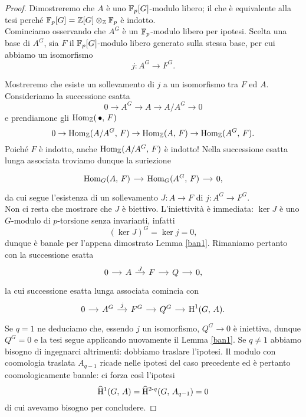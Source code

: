 \begin{proof}
	Dimostreremo che $ A $ è uno $ \mathbb{F}_p[G] $-modulo libero; il che è equivalente alla tesi perché $ \mathbb{F}_p[G] = \mathbb{Z}[G] \otimes_{\mathbb{Z}} \mathbb{F}_p $ è indotto. \\
	
	Cominciamo osservando che $ A^G $ è un $ \mathbb{F}_p $-modulo libero per ipotesi. Scelta una base di $ A^G $, sia $ F $ il $ \mathbb{F}_p[G] $-modulo libero generato sulla stessa base, per cui abbiamo un isomorfismo
	\[ j \colon A^G \to F^G. \]
	
	Mostreremo che esiste un sollevamento di $ j $ a un isomorfismo tra $ F $ ed $ A $. Consideriamo la successione esatta
	\[ 0 \to A^G \to A \to A/A^G \to 0 \]
	e prendiamone gli $ \operatorname{Hom}_{\mathbb{Z}}(\, \bullet, \, F) $
	\begin{equation}\label{homsucc1}
		0 \to \operatorname{Hom}_{\mathbb{Z}}(A/A^G, \, F) \to \operatorname{Hom}_{\mathbb{Z}}(A, \, F) \to \operatorname{Hom}_{\mathbb{Z}}(A^G, \, F).
	\end{equation}
	Poiché $ F $ è indotto, anche $ \operatorname{Hom}_{\mathbb{Z}}(A/A^G, \, F) $ è indotto! Nella successione esatta lunga associata troviamo dunque la suriezione
	\[ \begin{tikzcd}[column sep = small]
	\Hom_G(A, \, F) \rar & \Hom_G(A^G, \, F) \rar & 0,
	\end{tikzcd}\]
	da cui segue l'esistenza di un sollevamento $ J \colon A \to F $ di $ j \colon A^G \to F^G. $ \\
	
	Non ci resta che mostrare che $ J $ è biettivo. L'iniettività è immediata: $ \ker J $ è uno $ G $-modulo di $ p $-torsione senza invarianti, infatti
	\[ (\ker J)^G = \ker j = 0, \]
	dunque è banale per l'appena dimostrato Lemma \ref{ban1}. Rimaniamo pertanto con la successione esatta
	\[ \begin{tikzcd}[column sep = small]
	0 \rar& A \rar["J"]& F \rar& Q \rar& 0,
	\end{tikzcd} \]
	la cui successione esatta lunga associata comincia con
	\[ \begin{tikzcd}[column sep = small]
	0 \rar & A^G \rar["j"] & F^G \rar & Q^G \rar & \HH^1(G, \, A).
	\end{tikzcd} \]
	Se $ q = 1 $ ne deduciamo che, essendo $ j $ un isomorfismo, $ Q^G \to 0 $ è iniettiva, dunque $ Q^G = 0 $ e la tesi segue applicando nuovamente il Lemma \ref{ban1}. Se $ q \neq 1 $ abbiamo bisogno di ingegnarci altrimenti: dobbiamo traslare l'ipotesi. Il modulo con coomologia traslata $ A_{q-1} $ ricade nelle ipotesi del caso precedente ed è pertanto coomologicamente banale: ci forza così l'ipotesi 
	\[ \operatorname{\widehat{H}^{1}}(G, \, A) = \operatorname{\widehat{H}^{2-\mathnormal{q}}}(G, \, A_{q-1}) = 0 \]
	di cui avevamo bisogno per concludere.
\end{proof}

